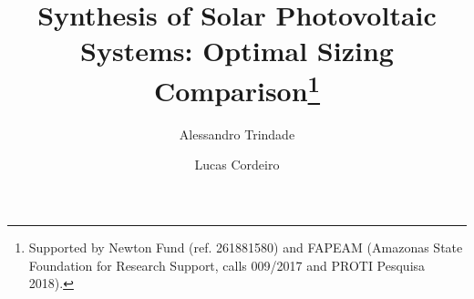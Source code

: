 \documentclass[runningheads]{llncs}
\begin{document}
%
\title{Synthesis of Solar Photovoltaic Systems: Optimal Sizing Comparison\thanks{Supported by Newton Fund (ref. 261881580) and FAPEAM (Amazonas State Foundation for Research Support, calls 009/2017 and PROTI Pesquisa 2018).}}
%
%
\author{Alessandro Trindade \and Lucas Cordeiro} %
%
%
\maketitle              %
\end{document}
